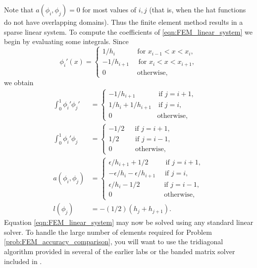 Note that $a(\phi_i,\phi_j) = 0$ for most values of $i, j$ (that is, when the hat functions do not have overlapping domains).
Thus the finite element method results in a sparse linear system.
To compute the coefficients of \eqref{eqn:FEM_linear_system} we begin by evaluating some integrals.
Since
\[\phi_i'(x) = \begin{cases}
1/h_i \quad \quad \quad \, \text{for } x_{i-1} < x < x_i,\\
 -1/h_{i+1} \quad \text{ for } x_{i} < x < x_{i+1},\\
0 \quad \quad \quad \quad \, \text{ otherwise},
\end{cases}\]
we obtain
\begin{align*}
\int_0^1  \phi_i'\phi_j' &= \begin{cases}
- 1/h_{i+1} \quad \quad \quad \text{ if } j=i+1,\\
1/h_i + 1/h_{i+1} \quad \text{if } j=i,\\
0 \quad \quad \quad \quad \quad \quad \, \text{ otherwise},
\end{cases} \\
\int_0^1  \phi_i'\phi_j &= \begin{cases}
- 1/2 \quad \,\text{ if } j=i+1,\\
1/2 \quad \quad \text{ if } j=i-1,\\
0 \quad \quad \quad \text{ otherwise},
\end{cases} \\
a(\phi_i,\phi_j) &= \begin{cases}
\epsilon/h_{i+1} + 1/2 \quad \quad \, \text{ if } j=i+1,\\
-\epsilon/h_i -\epsilon/h_{i+1} \quad  \text{ if } j=i,\\
\epsilon/h_i - 1/2 \quad \quad \quad \, \text{ if } j=i-1,\\
0 \quad \quad \quad \quad \quad \quad \,\,\,\,\,\,\, \text{ otherwise},
\end{cases}\\
l(\phi_j) &= -(1/2)(h_j + h_{j+1}).
\end{align*}
Equation \eqref{eqn:FEM_linear_system} may now be solved using any standard linear solver. 
To handle the large number of elements required for Problem \ref{prob:FEM_accuracy_comparison}, you will want to use the tridiagonal algorithm provided in several of the earlier labs 
or the banded matrix solver included in .

